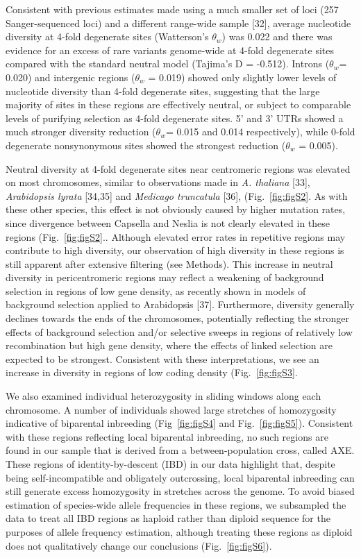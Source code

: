 Consistent with previous estimates made using a much smaller set of loci (257 Sanger-sequenced loci) and a different range-wide sample [32], average nucleotide diversity at 4-fold degenerate sites (Watterson’s $\theta_{w}$) was 0.022 and there was evidence for an excess of rare variants genome-wide at 4-fold degenerate sites compared with the standard neutral model (Tajima’s D = -0.512). Introns ($\theta_{w}$= 0.020) and intergenic regions ($\theta_{w}$ = 0.019) showed only slightly lower levels of nucleotide diversity than 4-fold degenerate sites, suggesting that the large majority of sites in these regions are effectively neutral, or subject to comparable levels of purifying selection as 4-fold degenerate sites. 5’ and 3’ UTRs showed a much stronger diversity reduction ($\theta_{w}$= 0.015 and 0.014 respectively), while 0-fold degenerate nonsynonymous sites showed the strongest reduction ($\theta_{w}$ = 0.005).

Neutral diversity at 4-fold degenerate sites near centromeric regions was elevated on most chromosomes, similar to observations made in \textit{A. thaliana} [33], \textit{Arabidopsis lyrata} [34,35] and \textit{Medicago truncatula} [36], (Fig.~\ref{fig:figS2}. As with these other species, this effect is not obviously caused by higher mutation rates, since divergence between Capsella and Neslia is not clearly elevated in these regions (Fig.~\ref{fig:figS2}.. Although elevated error rates in repetitive regions may contribute to high diversity, our observation of high diversity in these regions is still apparent after extensive filtering (see Methods). This increase in neutral diversity in pericentromeric regions may reflect a weakening of background selection in regions of low gene density, as recently shown in models of background selection applied to Arabidopsis [37].  Furthermore, diversity generally declines towards the ends of the chromosomes, potentially reflecting the stronger effects of background selection and/or selective sweeps in regions of relatively low recombination but high gene density, where the effects of linked selection are expected to be strongest. Consistent with these interpretations, we see an increase in diversity in regions of low coding density (Fig.~\ref{fig:figS3}.

We also examined individual heterozygosity in sliding windows along each chromosome. A number of individuals showed large stretches of homozygosity indicative of biparental inbreeding (Fig~\ref{fig:figS4} and Fig.~\ref{fig:figS5}). Consistent with these regions reflecting local biparental inbreeding, no such regions are found in our sample that is derived from a between-population cross, called AXE. These regions of identity-by-descent (IBD) in our data highlight that, despite being self-incompatible and obligately outcrossing, local biparental inbreeding can still generate excess homozygosity in stretches across the genome. To avoid biased estimation of species-wide allele frequencies in these regions, we subsampled the data to treat all IBD regions as haploid rather than diploid sequence for the purposes of allele frequency estimation, although treating these regions as diploid does not qualitatively change our conclusions (Fig.~\ref{fig:figS6}).

